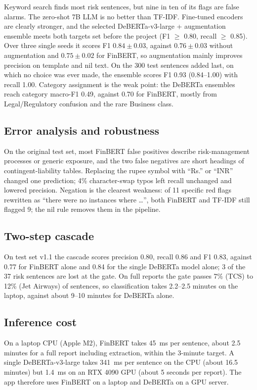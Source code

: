 \documentclass[conference]{IEEEtran}
\begin{document}
Keyword search finds most risk sentences, but nine in ten of its flags are false alarms. The zero-shot 7B LLM is no better than TF-IDF. Fine-tuned encoders are clearly stronger, and the selected DeBERTa-v3-large + augmentation ensemble meets both targets set before the project (F1 $\ge$ 0.80, recall $\ge$ 0.85). Over three single seeds it scores F1 $0.84\pm0.03$, against $0.76\pm0.03$ without augmentation and $0.75\pm0.02$ for FinBERT, so augmentation mainly improves precision on template and nil text. On the 300 test sentences added last, on which no choice was ever made, the ensemble scores F1 0.93 (0.84--1.00) with recall 1.00. Category assignment is the weak point: the DeBERTa ensembles reach category macro-F1 0.49, against 0.70 for FinBERT, mostly from Legal/Regulatory confusion and the rare Business class.

\subsection{Error analysis and robustness}
On the original test set, most FinBERT false positives describe risk-management processes or generic exposure, and the two false negatives are short headings of contingent-liability tables. Replacing the rupee symbol with ``Rs.'' or ``INR'' changed one prediction; 4\% character-swap typos left recall unchanged and lowered precision. Negation is the clearest weakness: of 11 specific red flags rewritten as ``there were no instances where \ldots'', both FinBERT and TF-IDF still flagged 9; the nil rule removes them in the pipeline.

\subsection{Two-step cascade}
On test set v1.1 the cascade scores precision 0.80, recall 0.86 and F1 0.83, against 0.77 for FinBERT alone and 0.84 for the single DeBERTa model alone; 3 of the 37 risk sentences are lost at the gate. On full reports the gate passes 7\% (TCS) to 12\% (Jet Airways) of sentences, so classification takes 2.2--2.5 minutes on the laptop, against about 9--10 minutes for DeBERTa alone.

\subsection{Inference cost}
On a laptop CPU (Apple M2), FinBERT takes 45~ms per sentence, about 2.5 minutes for a full report including extraction, within the 3-minute target. A single DeBERTa-v3-large takes 341~ms per sentence on the CPU (about 16.5 minutes) but 1.4~ms on an RTX 4090 GPU (about 5 seconds per report). The app therefore uses FinBERT on a laptop and DeBERTa on a GPU server.
\end{document}
